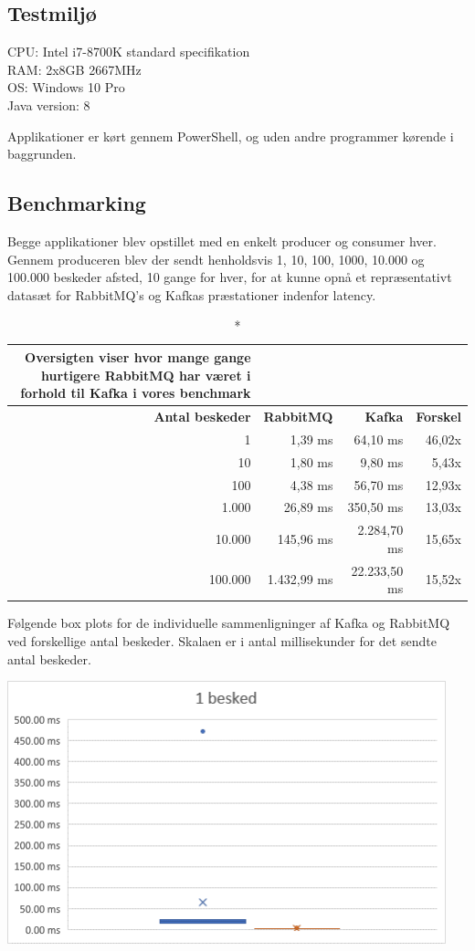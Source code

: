 \documentclass[
]{article}
\begin{document}
\hypertarget{testmiljuxf8}{%
\subsection{Testmiljø}\label{testmiljuxf8}}

CPU: Intel i7-8700K standard specifikation\\
RAM: 2x8GB 2667MHz\\
OS: Windows 10 Pro\\
Java version: 8

Applikationer er kørt gennem PowerShell, og uden andre programmer
kørende i baggrunden.

\hypertarget{benchmarking}{%
\subsection{Benchmarking}\label{benchmarking}}

Begge applikationer blev opstillet med en enkelt producer og consumer
hver. Gennem produceren blev der sendt henholdsvis 1, 10, 100, 1000,
10.000 og 100.000 beskeder afsted, 10 gange for hver, for at kunne opnå
et repræsentativt datasæt for RabbitMQ's og Kafkas præstationer indenfor
latency.


\begin{longtable}[]{@{}|r|r|r|r|@{}}
\caption*{Oversigten viser hvor mange gange hurtigere RabbitMQ har været i
forhold til Kafka i vores benchmark} \label{tab:long} \\
\toprule
\textbf{Antal beskeder} & \textbf{RabbitMQ} & \textbf{Kafka} &
\textbf{Forskel}\tabularnewline
\midrule
\endhead
1 & 1,39 ms & 64,10 ms & 46,02x\tabularnewline
10 & 1,80 ms & 9,80 ms & 5,43x\tabularnewline
100 & 4,38 ms & 56,70 ms & 12,93x\tabularnewline
1.000 & 26,89 ms & 350,50 ms & 13,03x\tabularnewline
10.000 & 145,96 ms & 2.284,70 ms & 15,65x\tabularnewline
100.000 & 1.432,99 ms & 22.233,50 ms & 15,52x\tabularnewline
\bottomrule
\end{longtable}

Følgende box plots for de individuelle sammenligninger af Kafka og
RabbitMQ ved forskellige antal beskeder. Skalaen er i antal
millisekunder for det sendte antal beskeder.

\includegraphics[width=5in,height=3in]{media/media/image5.png}
\end{document}
